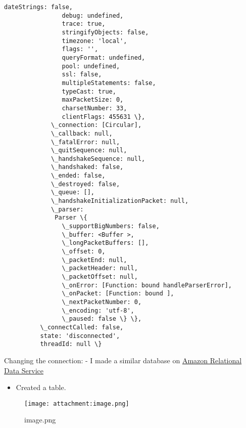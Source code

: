 \documentclass[11pt]{article}
\makeatletter
\def\maxwidth{\ifdim\Gin@nat@width>\linewidth\linewidth
    \else\Gin@nat@width\fi}
\let\Oldincludegraphics\includegraphics
\renewcommand{\includegraphics}[1]{\Oldincludegraphics[width=.8\maxwidth]{#1}}
\providecommand{\tightlist}{%
      \setlength{\itemsep}{0pt}\setlength{\parskip}{0pt}}
\makeatother
\begin{document}
\begin{Verbatim}[commandchars=\\\{\}]
                dateStrings: false,
                debug: undefined,
                trace: true,
                stringifyObjects: false,
                timezone: 'local',
                flags: '',
                queryFormat: undefined,
                pool: undefined,
                ssl: false,
                multipleStatements: false,
                typeCast: true,
                maxPacketSize: 0,
                charsetNumber: 33,
                clientFlags: 455631 \},
             \_connection: [Circular],
             \_callback: null,
             \_fatalError: null,
             \_quitSequence: null,
             \_handshakeSequence: null,
             \_handshaked: false,
             \_ended: false,
             \_destroyed: false,
             \_queue: [],
             \_handshakeInitializationPacket: null,
             \_parser: 
              Parser \{
                \_supportBigNumbers: false,
                \_buffer: <Buffer >,
                \_longPacketBuffers: [],
                \_offset: 0,
                \_packetEnd: null,
                \_packetHeader: null,
                \_packetOffset: null,
                \_onError: [Function: bound handleParserError],
                \_onPacket: [Function: bound ],
                \_nextPacketNumber: 0,
                \_encoding: 'utf-8',
                \_paused: false \} \},
          \_connectCalled: false,
          state: 'disconnected',
          threadId: null \}
\end{Verbatim}
            
     Changing the connection: - I made a similar database on
\href{https://aws.amazon.com/rds/}{Amazon Relational Data Service}

\begin{itemize}
\tightlist
\item
  Created a table.
\end{itemize}

    \begin{figure}
\centering
\texttt{[image: attachment:image.png]}
\caption{image.png}
\end{figure}
\end{document}
